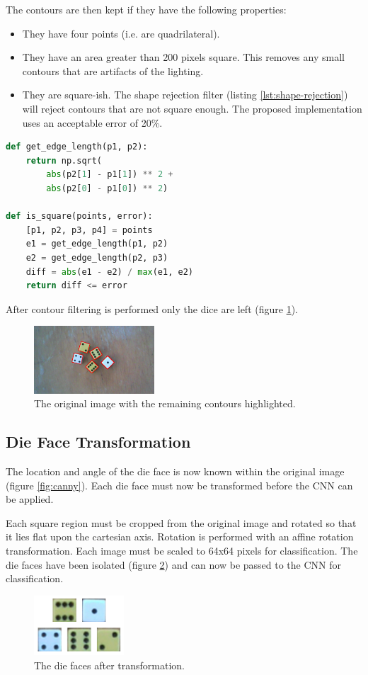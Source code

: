 \documentclass[conference]{IEEEtran}
\begin{document}
The contours are then kept if they have the following properties:
\begin{itemize}
	\item They have four points (i.e. are quadrilateral).
	\item They have an area greater than 200 pixels square. This removes any small contours that are artifacts of the lighting.
	\item They are square-ish. The shape rejection filter (listing \ref{lst:shape-rejection}) will reject contours that are not square enough.
		The proposed implementation uses an acceptable error of 20\%.
\end{itemize}
\begin{lstlisting}[language=python, caption={The shape rejection filter in Python.}, label={lst:shape-rejection}]
def get_edge_length(p1, p2):
    return np.sqrt(
    	abs(p2[1] - p1[1]) ** 2 +
    	abs(p2[0] - p1[0]) ** 2)

def is_square(points, error):
    [p1, p2, p3, p4] = points
    e1 = get_edge_length(p1, p2)
    e2 = get_edge_length(p2, p3)
    diff = abs(e1 - e2) / max(e1, e2)
    return diff <= error
\end{lstlisting}
After contour filtering is performed only the dice are left (figure \ref{fig:contour}). 
\begin{figure}[H]
	\centering
	\includegraphics[width=0.4\textwidth]{contours}
	\caption{The original image with the remaining contours highlighted.}
	\label{fig:contour}
\end{figure}

\subsection{Die Face Transformation}

The location and angle of the die face is now known within the original image (figure \ref{fig:canny}).
Each die face must now be transformed before the CNN can be applied.

Each square region must be cropped from the original image and rotated so that it lies flat upon the cartesian axis.
Rotation is performed with an affine rotation transformation.
Each image must be scaled to 64x64 pixels for classification.
The die faces have been isolated (figure \ref{fig:faces}) and can now be passed to the CNN for classification.
\begin{figure}[H]
	\centering
	\includegraphics[width=0.3\textwidth]{faces}
	\caption{The die faces after transformation.}
	\label{fig:faces}
\end{figure}
\end{document}
